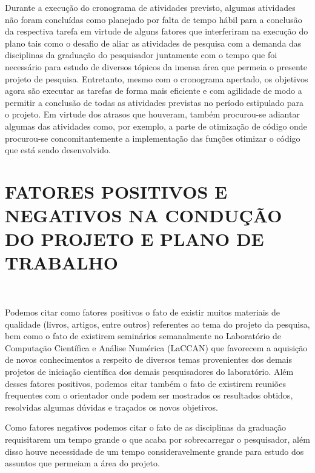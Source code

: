 \documentclass[12pt,letterpaper]{article}
\begin{document}
\newpage
Durante a execução do cronograma de atividades previsto, algumas atividades não foram concluídas como planejado por falta de tempo hábil para a conclusão da respectiva tarefa em virtude de alguns fatores que interferiram na execução do plano tais como o desafio de aliar as atividades de pesquisa com a demanda das disciplinas da graduação do pesquisador juntamente com o tempo que foi necessário para estudo de diversos tópicos da imensa área que permeia o presente projeto de pesquisa. Entretanto, mesmo com o cronograma apertado, os objetivos agora são executar as tarefas de forma mais eficiente e com agilidade de modo a permitir a conclusão de todas as atividades previstas no período estipulado para o projeto. Em virtude dos atrasos que houveram, também procurou-se adiantar algumas das atividades como, por exemplo, a parte de otimização de código onde procurou-se concomitantemente a implementação das funções otimizar o código que está sendo desenvolvido. 


\newpage
\newpage
\section*{\centering \textbf{FATORES POSITIVOS E NEGATIVOS NA CONDUÇÃO DO PROJETO E PLANO DE TRABALHO}}
\hrulefill \\

\vspace{0.5cm}

Podemos citar como fatores positivos o fato de existir muitos materiais de qualidade (livros, artigos, entre outros) referentes ao tema do projeto da pesquisa, bem como o fato de existirem seminários semanalmente no Laboratório de Computação Científica e Análise Numérica (LaCCAN) que favorecem a aquisição de novos conhecimentos a respeito de diversos temas provenientes dos demais projetos de iniciação científica dos demais pesquisadores do laboratório. Além desses fatores positivos, podemos citar também o fato de existirem reuniões frequentes com o orientador onde podem ser mostrados os resultados obtidos, resolvidas algumas dúvidas e traçados os novos objetivos. 

Como fatores negativos podemos citar o fato de as disciplinas da graduação requisitarem um tempo grande o que acaba por sobrecarregar o pesquisador, além disso houve necessidade de um tempo consideravelmente grande para estudo dos assuntos que permeiam a área do projeto.  
\end{document}
